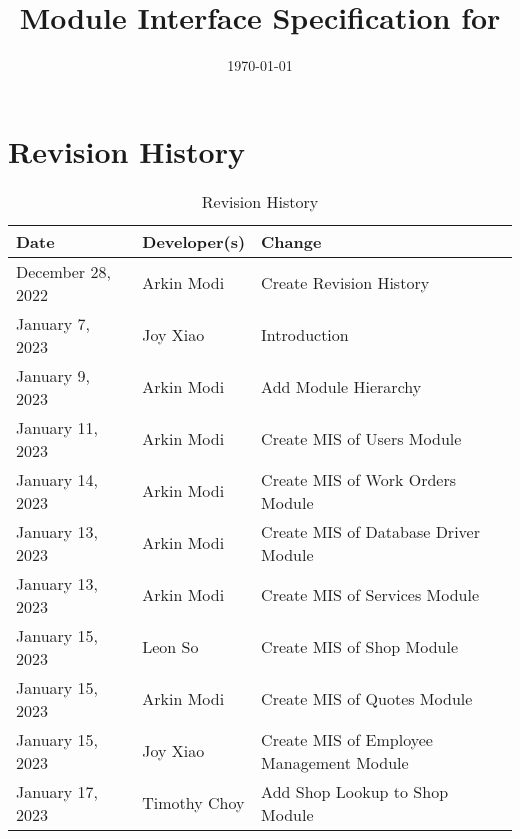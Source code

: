 \documentclass[12pt, titlepage]{article}
\begin{document}
\title{Module Interface Specification for \progname{}}

\author{\authname}

\date{\today}

\maketitle


\section{Revision History}

\begin{table}[hp]
	\caption{Revision History} \label{TblRevisionHistory}
	\begin{tabularx}{\textwidth}{llX}
		\toprule
		\textbf{Date}     & \textbf{Developer(s)} & \textbf{Change}                          \\
		\midrule
		December 28, 2022 & Arkin Modi            & Create Revision History                  \\
		January 7, 2023   & Joy Xiao              & Introduction                             \\
		January 9, 2023   & Arkin Modi            & Add Module Hierarchy                     \\
		January 11, 2023  & Arkin Modi            & Create MIS of Users Module               \\
		January 14, 2023  & Arkin Modi            & Create MIS of Work Orders Module         \\
		January 13, 2023  & Arkin Modi            & Create MIS of Database Driver Module     \\
		January 13, 2023  & Arkin Modi            & Create MIS of Services Module            \\
		January 15, 2023  & Leon So               & Create MIS of Shop Module                \\
		January 15, 2023  & Arkin Modi            & Create MIS of Quotes Module              \\
		January 15, 2023  & Joy Xiao              & Create MIS of Employee Management Module \\
		January 17, 2023  & Timothy Choy          & Add Shop Lookup to Shop Module           \\
		\bottomrule
	\end{tabularx}
\end{table}
\end{document}
